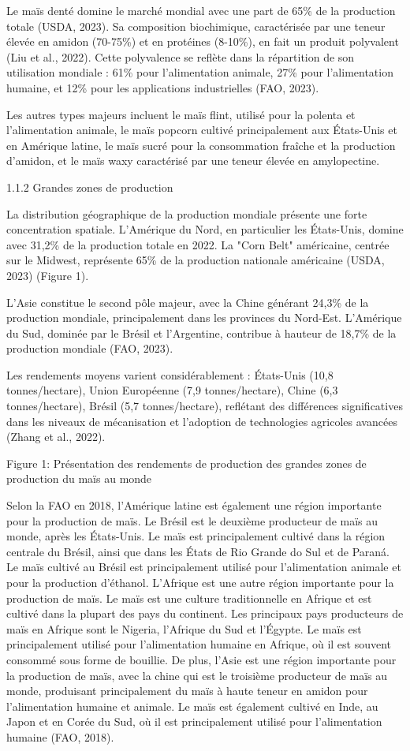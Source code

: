 \documentclass[12pt,oneside]{report}
\begin{document}
Le maïs denté domine le marché mondial avec une part de 65\% de la production totale (USDA, 2023). Sa composition biochimique, caractérisée par une teneur élevée en amidon (70-75\%) et en protéines (8-10\%), en fait un produit polyvalent (Liu et al., 2022). Cette polyvalence se reflète dans la répartition de son utilisation mondiale : 61\% pour l'alimentation animale, 27\% pour l'alimentation humaine, et 12\% pour les applications industrielles (FAO, 2023).

Les autres types majeurs incluent le maïs flint, utilisé pour la polenta et l'alimentation animale, le maïs popcorn cultivé principalement aux États-Unis et en Amérique latine, le maïs sucré pour la consommation fraîche et la production d'amidon, et le maïs waxy caractérisé par une teneur élevée en amylopectine.

1.1.2 Grandes zones de production

La distribution géographique de la production mondiale présente une forte concentration spatiale. L'Amérique du Nord, en particulier les États-Unis, domine avec 31,2\% de la production totale en 2022. La "Corn Belt" américaine, centrée sur le Midwest, représente 65\% de la production nationale américaine (USDA, 2023) (Figure 1).

L'Asie constitue le second pôle majeur, avec la Chine générant 24,3\% de la production mondiale, principalement dans les provinces du Nord-Est. L'Amérique du Sud, dominée par le Brésil et l'Argentine, contribue à hauteur de 18,7\% de la production mondiale (FAO, 2023).

Les rendements moyens varient considérablement : États-Unis (10,8 tonnes/hectare), Union Européenne (7,9 tonnes/hectare), Chine (6,3 tonnes/hectare), Brésil (5,7 tonnes/hectare), reflétant des différences significatives dans les niveaux de mécanisation et l'adoption de technologies agricoles avancées (Zhang et al., 2022).

Figure 1: Présentation des rendements de production des grandes zones de production du maïs au monde

Selon la FAO en 2018, l'Amérique latine est également une région importante pour la production de maïs. Le Brésil est le deuxième producteur de maïs au monde, après les États-Unis. Le maïs est principalement cultivé dans la région centrale du Brésil, ainsi que dans les États de Rio Grande do Sul et de Paraná. Le maïs cultivé au Brésil est principalement utilisé pour l'alimentation animale et pour la production d'éthanol. L'Afrique est une autre région importante pour la production de maïs. Le maïs est une culture traditionnelle en Afrique et est cultivé dans la plupart des pays du continent. Les principaux pays producteurs de maïs en Afrique sont le Nigeria, l'Afrique du Sud et l'Égypte. Le maïs est principalement utilisé pour l'alimentation humaine en Afrique, où il est souvent consommé sous forme de bouillie. De plus, l'Asie est une région importante pour la production de maïs, avec la chine qui est le troisième producteur de maïs au monde, produisant principalement du maïs à haute teneur en amidon pour l'alimentation humaine et animale. Le maïs est également cultivé en Inde, au Japon et en Corée du Sud, où il est principalement utilisé pour l'alimentation humaine (FAO, 2018).
\end{document}
